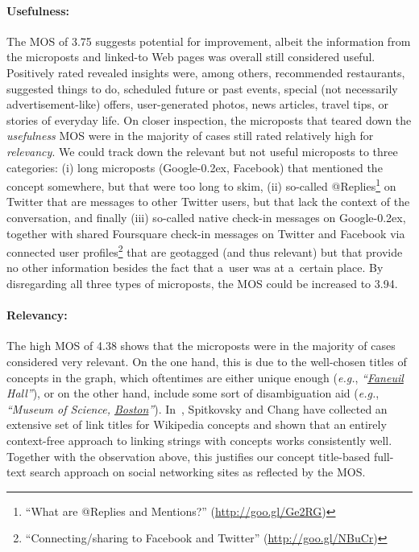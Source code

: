 \documentclass[runningheads,a4paper]{llncs}
\newcommand{\googleplus}{Google\nolinebreak\hspace{0em}\raisebox{.28ex}{\tiny\bf +}\kern-0.2ex\xspace}
\begin{document}
\paragraph{Usefulness:}
The MOS of 3.75 suggests potential for improvement,
albeit the information from the microposts and linked-to Web pages
was overall still considered useful.
Positively rated revealed insights were, among others, recommended restaurants,
suggested things to do, scheduled future or past events,
special (not necessarily advertisement-like) offers, user-generated photos,
news articles, travel tips, or stories of everyday life.
On closer inspection, the microposts that teared down the \emph{usefulness} MOS
were in the majority of cases still rated relatively high for \emph{relevancy}.
We could track down the relevant but not useful microposts to three categories:
(i) long microposts (\googleplus, Facebook) that mentioned the concept somewhere,
but that were too long to skim,
(ii) so-called
@Replies\footnote{``What are @Replies and Mentions?'' (\url{http://goo.gl/Ge2RG})}
on Twitter that are messages to other Twitter users,
but that lack the context of the conversation, and finally
(iii) so-called native check-in messages on \googleplus,
together with shared Foursquare check-in messages on Twitter and Facebook
via connected user profiles\footnote{``Connecting/sharing to Facebook and Twitter'' (\url{http://goo.gl/NBuCr})}
that are geotagged (and thus relevant) but that provide no other information besides the fact that a~user was at a~certain place.
By disregarding all three types of microposts, the MOS could be increased to 3.94.

\vspace{-0.7em}
\paragraph{Relevancy:} \label{sec:relevancy}
The high MOS of 4.38 shows that the microposts
were in the majority of cases considered very relevant.
On the one hand, this is due to the well-chosen titles of concepts in the graph,
which oftentimes are either unique enough (\emph{e.g.}, \emph{``\underline{Faneuil} Hall''}),
or on the other hand, include some sort of disambiguation aid
(\emph{e.g.}, \emph{``Museum of Science, \underline{Boston}''}).
In~\cite{spitkovsky2012}, Spitkovsky and Chang have collected
an extensive set of link titles for Wikipedia concepts
and shown that an entirely context-free approach
to linking strings with concepts works consistently well.
Together with the observation above, this justifies
our concept title-based full-text search approach on social networking sites as
reflected by the MOS.
\end{document}
